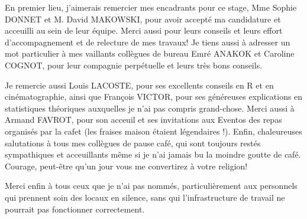\documentclass{book}
\begin{document}
\noindent
\large{En premier lieu, j'aimerais remercier mes encadrants pour ce stage, Mme Sophie DONNET et
    M. David MAKOWSKI, pour avoir accepté ma candidature et acceuilli au sein de
    leur équipe. Merci aussi pour leurs conseils et leurs effort d'accompagnement et de relecture de mes travaux! Je tiens aussi à adresser un mot particulier à mes vaillants collègues de bureau Emré ANAKOK et Caroline COGNOT, pour leur compagnie perpétuelle et leurs très bons
    conseils.}
\par %
Je remercie aussi Louis LACOSTE, pour ses excellents conseils en R et en cinématographie, ainsi que François VICTOR, pour ses généreuses explications en statistiques théoriques auxquelles je n'ai pas compris grand-chose. Merci aussi à Armand FAVROT, pour son acceuil et ses invitations aux Eventos des repas organisés par la cafet (les fraises maison étaient légendaires !). Enfin, chaleureuses salutations à tous mes collègues de pause café, qui sont toujours restés sympathiques et acceuillants même si je n'ai jamais bu la moindre goutte de café. Courage, peut-être qu'un jour vous me convertirez à votre religion!

Merci enfin à tous ceux que je n'ai pas nommés, particulièrement aux personnels qui prennent soin des locaux en silence, sans qui l'infrastructure de travail ne pourrait pas fonctionner correctement.

\thispagestyle{fancy}
\clearpage %


\newpage
\mbox{} %
\thispagestyle{fancy}


\newpage
\fancyhead[LE,RO]{\leftmark}
\tableofcontents %
\thispagestyle{fancy}

\end{document}
